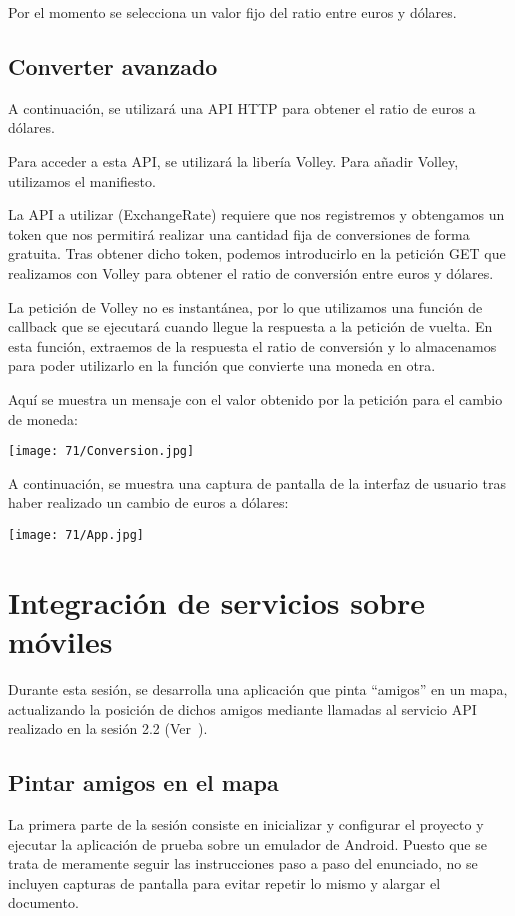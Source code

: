 Por el momento se selecciona un valor fijo del ratio entre euros y dólares.

\subsection{Converter avanzado}
A continuación, se utilizará una API HTTP para obtener el ratio de euros a dólares.

Para acceder a esta API, se utilizará la libería Volley.
Para añadir Volley, utilizamos el manifiesto.

La API a utilizar (ExchangeRate) requiere que nos registremos y obtengamos un token
que nos permitirá realizar una cantidad fija de conversiones de forma gratuita.
Tras obtener dicho token, podemos introducirlo en la petición GET que realizamos con
Volley para obtener el ratio de conversión entre euros y dólares.

La petición de Volley no es instantánea, por lo que utilizamos una función de callback
que se ejecutará cuando llegue la respuesta a la petición de vuelta.
En esta función, extraemos de la respuesta el ratio de conversión y lo almacenamos
para poder utilizarlo en la función que convierte una moneda en otra.

Aquí se muestra un mensaje con el valor obtenido por la petición para el cambio de moneda:

\begin{minipage}{\linewidth}
	\centering
	\texttt{[image: 71/Conversion.jpg]}
	\label{fig:71/1}
\end{minipage}

A continuación, se muestra una captura de pantalla de la interfaz de usuario tras
haber realizado un cambio de euros a dólares:

\begin{minipage}{\linewidth}
	\centering
	\texttt{[image: 71/App.jpg]}
	\label{fig:71/2}
\end{minipage}
\newpage{}
\section{Integración de servicios sobre móviles}
Durante esta sesión, se desarrolla una aplicación que pinta ``amigos'' en un mapa,
actualizando la posición de dichos amigos mediante llamadas al servicio API realizado
en la sesión 2.2 (Ver~).

\subsection{Pintar amigos en el mapa}
La primera parte de la sesión consiste en inicializar y configurar el proyecto y
ejecutar la aplicación de prueba sobre un emulador de Android. Puesto que se trata
de meramente seguir las instrucciones paso a paso del enunciado, no se incluyen
capturas de pantalla para evitar repetir lo mismo y alargar el documento.

